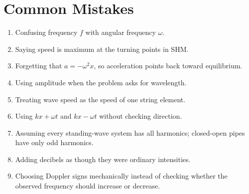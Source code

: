 \documentclass{studentnotes}
\begin{document}
\section{Common Mistakes}

\begin{enumerate}
    \item Confusing frequency \(f\) with angular frequency \(\omega\).
    \item Saying speed is maximum at the turning points in SHM.
    \item Forgetting that \(a=-\omega^2x\), so acceleration points back toward
    equilibrium.
    \item Using amplitude when the problem asks for wavelength.
    \item Treating wave speed as the speed of one string element.
    \item Using \(kx+\omega t\) and \(kx-\omega t\) without checking direction.
    \item Assuming every standing-wave system has all harmonics; closed-open
    pipes have only odd harmonics.
    \item Adding decibels as though they were ordinary intensities.
    \item Choosing Doppler signs mechanically instead of checking whether the
    observed frequency should increase or decrease.
\end{enumerate}
\end{document}
